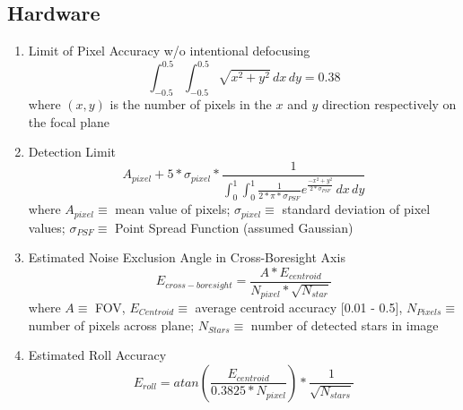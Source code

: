 \subsection{Hardware}
\begin{enumerate}
    \item Limit of Pixel Accuracy w/o intentional defocusing\cite{accuracy_performance_of_star_trackers}
    \[ \int_{-0.5}^{0.5}\int_{-0.5}^{0.5} \sqrt{x^2 + y^2} \,dx\,dy  = 0.38\]
    where $(x,y)$ is the number of pixels in the $x$ and $y$ direction respectively on the focal plane

    \item Detection Limit\cite{accuracy_performance_of_star_trackers}
    \[ A_{pixel} + 5*\sigma_{pixel} * \frac{1}{\int_{0}^{1}\int_{0}^{1} \frac{1}{2*\pi*\sigma_{PSF}}e^{\frac{-x^2+y^2}{2*\sigma_{PSF}}} \,dx\,dy} \]
    where $A_{pixel}\equiv$ mean value of pixels; $\sigma_{pixel} \equiv$ standard deviation of pixel values; $\sigma_{PSF} \equiv$ Point Spread Function (assumed Gaussian)

    \item Estimated Noise Exclusion Angle in Cross-Boresight Axis
    \[ E_{cross-boresight} = \frac{A*E_{centroid}}{N_{pixel}*\sqrt{N_{star}}} \]
    where $A \equiv$ FOV, $E_{Centroid} \equiv$ average centroid accuracy [0.01 - 0.5], $N_{Pixels} \equiv$ number of pixels across plane; $N_{Stars} \equiv$ number of detected stars in image

    \item Estimated Roll Accuracy
    \[ E_{roll} = atan(\frac{E_{centroid}}{0.3825*N_{pixel}}) * \frac{1}{\sqrt{N_{stars}}} \]

\end{enumerate}

